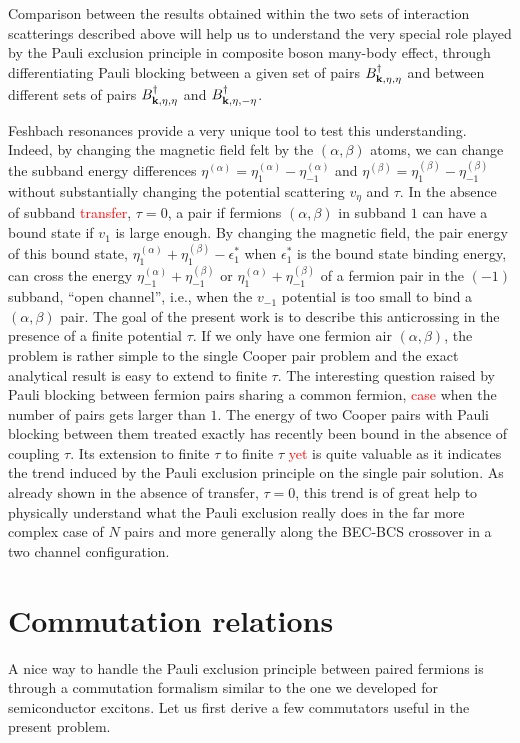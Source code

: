 \documentclass[11pt]{article} %
\newcommand{\ns}[1]{\textcolor{red}{#1}}
\begin{document}
Comparison between the results obtained within the two sets of interaction scatterings described above will help us to understand the very special role played by the Pauli exclusion principle in composite boson many-body effect, through differentiating Pauli blocking between a given set of pairs $B^{\dagger}_{\mathbf{k},\eta,\eta}$ and between different sets of pairs $B^{\dagger}_{\mathbf{k},\eta,\eta}$ and $B^{\dagger}_{\mathbf{k},\eta,-\eta}$.

Feshbach resonances provide a very unique tool to test this understanding. Indeed, by changing the magnetic field felt by the $(\alpha,\beta)$ atoms, we can change the subband energy differences $\eta^{(\alpha)}=\eta^{(\alpha)}_1-\eta^{(\alpha)}_{-1}$ and  $\eta^{(\beta)}=\eta^{(\beta)}_1-\eta^{(\beta)}_{-1}$ without substantially changing the potential scattering $v_{\eta}$ and $\tau$.  In the absence of subband \ns{transfer}, $\tau=0$, a pair if fermions $(\alpha,\beta)$ in subband $1$ can have a bound state if $v_1$ is large enough.  By changing the magnetic field, the pair energy of this bound state, $\eta^{(\alpha)}_1+\eta^{(\beta)}_{1}-\epsilon_1^*$ when $\epsilon_1^*$ is the bound state binding energy, can cross the energy  $\eta^{(\alpha)}_{-1}+\eta^{(\beta)}_{-1}$ or  $\eta^{(\alpha)}_{1}+\eta^{(\beta)}_{-1}$ of a fermion pair in the $(-1)$ subband, ``open channel'', i.e., when the $v_{-1}$ potential is too small to bind a  $(\alpha,\beta)$ pair. The goal of the present work is to describe this anticrossing in the presence of a finite potential $\tau$.  If we only have one fermion air  $(\alpha,\beta)$, the problem is  rather simple to the single Cooper pair problem and the exact analytical result is easy to extend to finite $\tau$.  The interesting question raised by Pauli blocking between fermion pairs sharing a common fermion, \ns{case} when the number of pairs gets larger than $1$.  The energy of two Cooper pairs with Pauli blocking between them treated exactly has recently been bound in the absence of coupling $\tau$\cite{combescotBCS}.  Its extension to finite $\tau$ to finite $\tau$ \ns{yet} is quite valuable as it indicates the trend induced by the Pauli exclusion principle on the single pair solution.  As already shown in the absence of transfer, $\tau=0$, this trend is of great help to physically understand what the Pauli exclusion really does in the far more complex case of $N$ pairs and more generally along the BEC-BCS crossover in a two channel configuration. 

\section{Commutation relations}
A nice way to handle the Pauli exclusion principle between paired fermions is through a commutation formalism similar to the one we developed for semiconductor excitons\cite{CobosonPhysicsReports}.  Let us first derive a few commutators useful in the present problem. 
\end{document}
